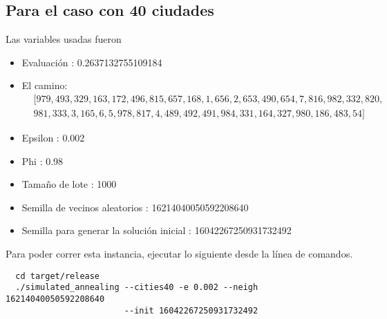 \documentclass[a4paper]{article}
\begin{document}
\subsection*{Para el caso con 40 ciudades}
Las variables usadas fueron
\begin{itemize}
\item Evaluaci\'on : 0.2637132755109184
\item El camino:
  \begin{align*}
    &[979, 493, 329, 163, 172, 496, 815, 657, 168, 1, 656, 2, 653, 490, 654, 7, 816, 982, 332, 820,\\
    &981, 333, 3, 165, 6, 5, 978, 817, 4, 489, 492, 491, 984, 331, 164, 327, 980, 186, 483, 54]
  \end{align*}
  
\item Epsilon : 0.002
\item Phi : 0.98
\item Tamaño de lote : 1000
\item Semilla de vecinos aleatorios : 16214040050592208640
\item Semilla para generar la soluci\'on inicial : 16042267250931732492
\end{itemize}
Para poder correr esta instancia, ejecutar lo siguiente desde la l\'inea de comandos.
\begin{lstlisting}
  cd target/release
  ./simulated_annealing --cities40 -e 0.002 --neigh 16214040050592208640
                        --init 16042267250931732492
\end{lstlisting}
\end{document}

